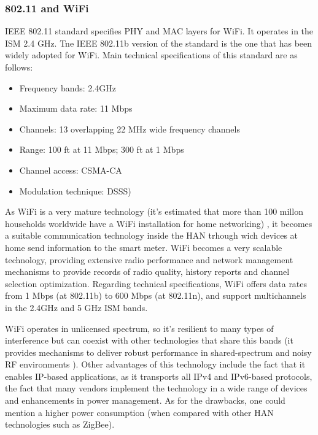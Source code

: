 \documentclass[11pt,draftclsnofoot,onecolumn]{IEEEtran}
\begin{document}
 
%

\subsubsection{802.11 and WiFi}

IEEE 802.11 standard \cite{Cali80211} specifies PHY and MAC layers for WiFi. It operates in the ISM 2.4 GHz. Tne IEEE 802.11b version of the standard is the one that has been widely adopted for WiFi. Main technical specifications of this standard are as follows:

\begin{itemize}
	\item Frequency bands: 2.4GHz
	\item Maximum data rate: 11 Mbps
	\item Channels: 13 overlapping 22 MHz wide frequency channels
	\item Range: 100 ft at 11 Mbps; 300 ft at 1 Mbps
	\item Channel access: CSMA-CA
	\item Modulation technique: DSSS)
\end{itemize}  

As WiFi is a very mature technology (it's estimated that more than 100 millon households worldwide have a WiFi installation for home networking) \cite{WiFi2010}, it becomes a suitable communication technology inside the HAN trhough wich devices at home send information to the smart meter. WiFi becomes a very scalable technology, providing extensive radio performance and network management mechanisms to provide records of radio quality, history reports and channel selection optimization. Regarding technical specifications, WiFi offers data rates from 1 Mbps (at 802.11b) to 600 Mbps (at 802.11n),  and support multichannels in the 2.4GHz and 5 GHz ISM bands. 

WiFi operates in unlicensed spectrum, so it's resilient to many types of interference but can coexist with other technologies that share this bands (it provides mechanisms to deliver robust performance in shared-spectrum and noisy RF environments  \cite{WiFi2010}). Other advantages of this technology include the fact that it enables IP-based applications, as it transports all IPv4 and IPv6-based protocols, the fact that many vendors implement the technology in a wide range of devices and enhancements in power management. As for the drawbacks, one could mention a higher power consumption (when compared with other HAN technologies such as ZigBee).  
\end{document}
